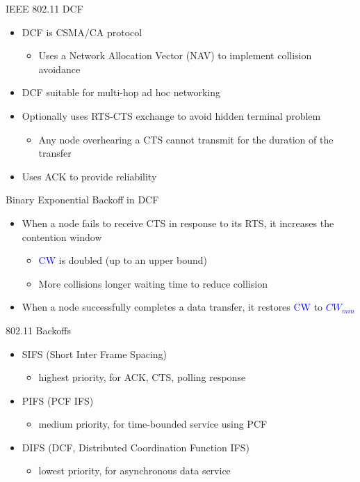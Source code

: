 \documentclass[pdf]{beamer}
\begin{document}

\begin{frame}{IEEE 802.11 DCF}
  \begin{itemize}
  \item DCF is CSMA/CA protocol
    \begin{itemize}
    \item Uses a Network Allocation Vector (NAV) to implement
      collision avoidance
    \end{itemize}  
  \item DCF suitable for multi-hop ad hoc networking
  \item Optionally uses RTS-CTS exchange to avoid hidden terminal problem
    \begin{itemize}
    \item Any node overhearing a CTS cannot transmit for the duration
      of the transfer
    \end{itemize}
  \item Uses ACK to provide reliability
  \end{itemize}
\end{frame}

\begin{frame}{Binary Exponential Backoff in DCF}
  \begin{itemize}
  \item  When a node fails to receive CTS in response to its
    RTS, it increases the contention window
    \begin{itemize}
    \item \textcolor{blue}{CW} is doubled (up to an upper bound)
    \item More collisions longer waiting time to reduce collision
    \end{itemize}
  \item When a node successfully completes a data transfer, it
    restores \textcolor{blue}{CW} to \textcolor{blue}{$CW_{min}$}
  \end{itemize}
\end{frame}

\begin{frame}{802.11 Backoffs}
  \begin{itemize}
  \item SIFS (Short Inter Frame Spacing)
    \begin{itemize}
    \item highest priority, for ACK, CTS, polling response    
    \end{itemize}
  \item PIFS (PCF IFS)
    \begin{itemize}
    \item medium priority, for time-bounded service using PCF
    \end{itemize}    
  \item DIFS (DCF, Distributed Coordination Function IFS)
    \begin{itemize}
    \item lowest priority, for asynchronous data service
    \end{itemize}
  \end{itemize}
\end{frame}
\end{document}

